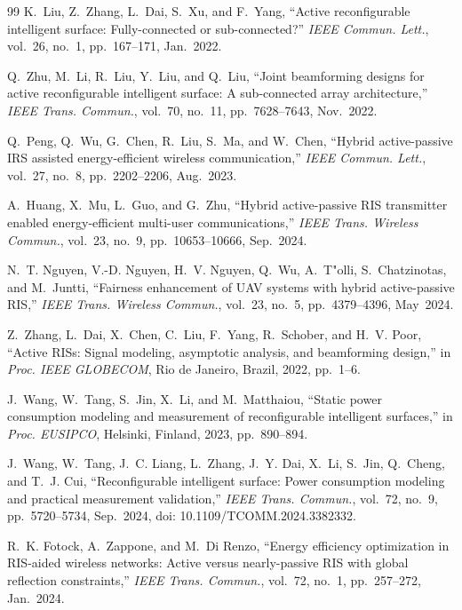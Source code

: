 \documentclass[journal]{IEEEtran}
\begin{document}
\begin{thebibliography}{99}
K.~Liu, Z.~Zhang, L.~Dai, S.~Xu, and F.~Yang,
``Active reconfigurable intelligent surface: Fully-connected or sub-connected?''
\emph{IEEE Commun. Lett.}, vol.~26, no.~1, pp.~167--171, Jan.~2022.

Q.~Zhu, M.~Li, R.~Liu, Y.~Liu, and Q.~Liu,
``Joint beamforming designs for active reconfigurable intelligent surface: A sub-connected array architecture,''
\emph{IEEE Trans. Commun.}, vol.~70, no.~11, pp.~7628--7643, Nov.~2022.

Q.~Peng, Q.~Wu, G.~Chen, R.~Liu, S.~Ma, and W.~Chen,
``Hybrid active-passive IRS assisted energy-efficient wireless communication,''
\emph{IEEE Commun. Lett.}, vol.~27, no.~8, pp.~2202--2206, Aug.~2023.

A.~Huang, X.~Mu, L.~Guo, and G.~Zhu,
``Hybrid active-passive RIS transmitter enabled energy-efficient multi-user communications,''
\emph{IEEE Trans. Wireless Commun.}, vol.~23, no.~9, pp.~10653--10666, Sep.~2024.

N.~T. Nguyen, V.-D. Nguyen, H.~V. Nguyen, Q.~Wu, A.~T"olli, S.~Chatzinotas, and M.~Juntti,
``Fairness enhancement of UAV systems with hybrid active-passive RIS,''
\emph{IEEE Trans. Wireless Commun.}, vol.~23, no.~5, pp.~4379--4396, May~2024.

Z.~Zhang, L.~Dai, X.~Chen, C.~Liu, F.~Yang, R.~Schober, and H.~V. Poor,
``Active RISs: Signal modeling, asymptotic analysis, and beamforming design,''
in \emph{Proc. IEEE GLOBECOM}, Rio de Janeiro, Brazil, 2022, pp.~1--6.

J.~Wang, W.~Tang, S.~Jin, X.~Li, and M.~Matthaiou,
``Static power consumption modeling and measurement of reconfigurable intelligent surfaces,''
in \emph{Proc. EUSIPCO}, Helsinki, Finland, 2023, pp.~890--894.

J.~Wang, W.~Tang, J.~C. Liang, L.~Zhang, J.~Y. Dai, X.~Li, S.~Jin, Q.~Cheng, and T.~J. Cui,
``Reconfigurable intelligent surface: Power consumption modeling and practical measurement validation,''
\emph{IEEE Trans. Commun.}, vol.~72, no.~9, pp.~5720--5734, Sep.~2024, doi: 10.1109/TCOMM.2024.3382332.

R.~K. Fotock, A.~Zappone, and M.~Di Renzo,
``Energy efficiency optimization in RIS-aided wireless networks: Active versus nearly-passive RIS with global reflection constraints,''
\emph{IEEE Trans. Commun.}, vol.~72, no.~1, pp.~257--272, Jan.~2024.


\end{thebibliography}
\end{document}
